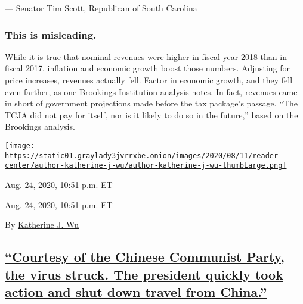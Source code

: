 --- Senator Tim Scott, Republican of South Carolina

\hypertarget{this-is-misleading}{%
\subsubsection{\texorpdfstring{\textbf{This is
misleading.}}{This is misleading.}}\label{this-is-misleading}}

While it is true that
\href{https://slack-redir.net/link?url=https\%3A\%2F\%2Fwww.fiscal.treasury.gov\%2Ffiles\%2Freports-statements\%2Ffinancial-report\%2F2018\%2FExecutivesummary-2018.pdf}{nominal
revenues} were higher in fiscal year 2018 than in fiscal 2017, inflation
and economic growth boost those numbers. Adjusting for price increases,
revenues actually fell. Factor in economic growth, and they fell even
farther, as
\href{https://slack-redir.net/link?url=https\%3A\%2F\%2Fwww.brookings.edu\%2Fpolicy2020\%2Fvotervital\%2Fdid-the-2017-tax-cut-the-tax-cuts-and-jobs-act-pay-for-itself\%2F}{one
Brookings Institution} analysis notes. In fact, revenues came in short
of government projections made before the tax package's passage. ``The
TCJA did not pay for itself, nor is it likely to do so in the future,''
based on the Brookings analysis.

\href{https://www.nytimes3xbfgragh.onion/by/katherine-j--wu}{\texttt{[image: https://static01.graylady3jvrrxbe.onion/images/2020/08/11/reader-center/author-katherine-j-wu/author-katherine-j-wu-thumbLarge.png]}}

Aug. 24, 2020, 10:51 p.m. ET

Aug. 24, 2020, 10:51 p.m. ET

By
\href{https://www.nytimes3xbfgragh.onion/by/katherine-j--wu}{Katherine
J. Wu}

\hypertarget{courtesy-of-the-chinese-communist-party-the-virus-struck-the-president-quickly-took-action-and-shut-down-travel-from-china}{%
\subsection{\texorpdfstring{\protect\hyperlink{courtesy-of-the-chinese-communist-party-the-virus-struck-the-president-quickly-took-action-and-shut-down-travel-from-china}{``Courtesy
of the Chinese Communist Party, the virus struck. The president quickly
took action and shut down travel from
China.''}}{``Courtesy of the Chinese Communist Party, the virus struck. The president quickly took action and shut down travel from China.''}}\label{courtesy-of-the-chinese-communist-party-the-virus-struck-the-president-quickly-took-action-and-shut-down-travel-from-china}}

